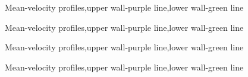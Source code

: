 \begin{figure}[H]
\centering
 \caption{Mean-velocity profiles,upper wall-purple line,lower wall-green line}
\label{pd}
\end{figure}


\begin{figure}[H]
\centering
 \caption{Mean-velocity profiles,upper wall-purple line,lower wall-green line}
\label{pd}
\end{figure}

\begin{figure}[H]
\centering
 \caption{Mean-velocity profiles,upper wall-purple line,lower wall-green line}
\label{pd}
\end{figure}

\begin{figure}[H]
\centering
 \caption{Mean-velocity profiles,upper wall-purple line,lower wall-green line}
\label{pd}
\end{figure}

